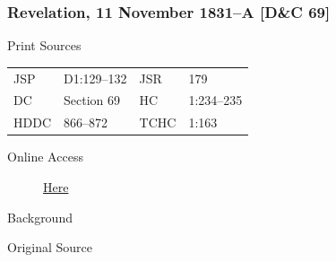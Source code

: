 {		%
		\subsubsection{Revelation, 11 November 1831--A [D\&C 69]}
			\label{EMS-1831-JS-11-NOV-1831-A}
		
			\begin{description}
				\item[Print Sources]
			\end{description}

				\begin{tabular}{p{0.5in}p{1in}p{0.5in}p{1in}}
				JSP	 	& D1:129--132	& JSR 		& 179 \\
				DC	 	& Section 69 	& HC 		& 1:234--235 \\
				HDDC 	& 866--872		& TCHC 		& 1:163 \\
				\end{tabular}
			
			\begin{description}
				\item[Online Access] \href{https://www.josephsmithpapers.org/paper-summary/revelation-11-november-1831-a-dc-69/1}{Here}
			\end{description}
			
			\begin{description}
				\item[Background]
			\end{description}
			
			
			\begin{description}
				\item[Original Source]
			\end{description}
			
			
}
